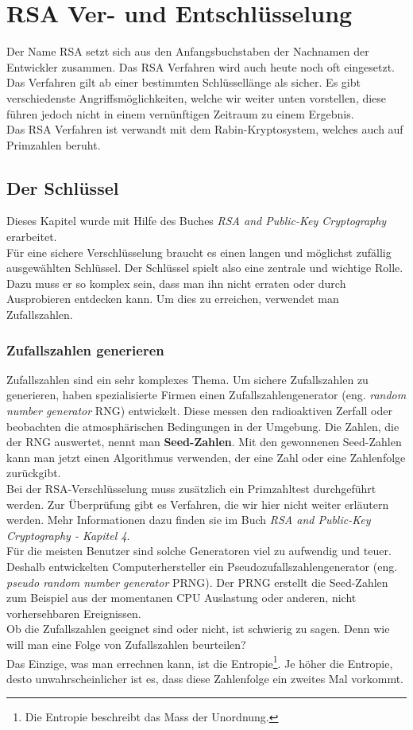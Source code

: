 \newpage
\section{RSA Ver- und Entschlüsselung}
Der Name RSA setzt sich aus den Anfangsbuchstaben der Nachnamen der Entwickler zusammen. Das RSA Verfahren wird auch heute noch oft eingesetzt. Das Verfahren gilt ab einer bestimmten Schlüssellänge als sicher. Es gibt verschiedenste Angriffsmöglichkeiten, welche wir weiter unten vorstellen, diese führen jedoch nicht in einem vernünftigen Zeitraum zu einem Ergebnis. \\
Das RSA Verfahren ist verwandt mit dem Rabin-Kryptosystem, welches auch auf Primzahlen beruht. %

\subsection{Der Schlüssel}
Dieses Kapitel wurde mit Hilfe des Buches \textit{RSA and Public-Key Cryptography} erarbeitet.\\[2ex]
%
Für eine sichere Verschlüsselung braucht es einen langen und möglichst zufällig ausgewählten Schlüssel. Der Schlüssel spielt also eine zentrale und wichtige Rolle. Dazu muss er so komplex sein, dass man ihn nicht erraten oder durch Ausprobieren entdecken kann. Um dies zu erreichen, verwendet man Zufallszahlen.
%
\subsubsection{Zufallszahlen generieren}
Zufallszahlen sind ein sehr komplexes Thema. Um sichere Zufallszahlen zu generieren, haben spezialisierte Firmen einen Zufallszahlengenerator (eng. \textit{random number generator} RNG) entwickelt. Diese messen den radioaktiven Zerfall oder beobachten die atmosphärischen Bedingungen in der Umgebung. Die Zahlen, die der RNG auswertet, nennt man \textbf{Seed-Zahlen}. Mit den gewonnenen Seed-Zahlen kann man jetzt einen Algorithmus verwenden, der eine Zahl oder eine Zahlenfolge zurückgibt.\\
Bei der RSA-Verschlüsselung muss zusätzlich ein Primzahltest durchgeführt werden.
Zur Überprüfung gibt es Verfahren, die wir hier nicht weiter erläutern werden. Mehr Informationen dazu finden sie im Buch \textit{RSA and Public-Key Cryptography - Kapitel 4}.\\
%
Für die meisten Benutzer sind solche Generatoren viel zu aufwendig und teuer. Deshalb entwickelten Computerhersteller ein Pseudozufallszahlengenerator (eng. \textit{pseudo random number generator} PRNG). Der PRNG erstellt die Seed-Zahlen zum Beispiel aus der momentanen CPU Auslastung oder anderen, nicht vorhersehbaren Ereignissen.\\
Ob die Zufallszahlen geeignet sind oder nicht, ist schwierig zu sagen. Denn wie will man eine Folge von Zufallszahlen beurteilen?\\
Das Einzige, was man errechnen kann, ist die Entropie\footnote{Die Entropie beschreibt das Mass der Unordnung.}. Je höher die Entropie, desto unwahrscheinlicher ist es, dass diese Zahlenfolge ein zweites Mal vorkommt.
